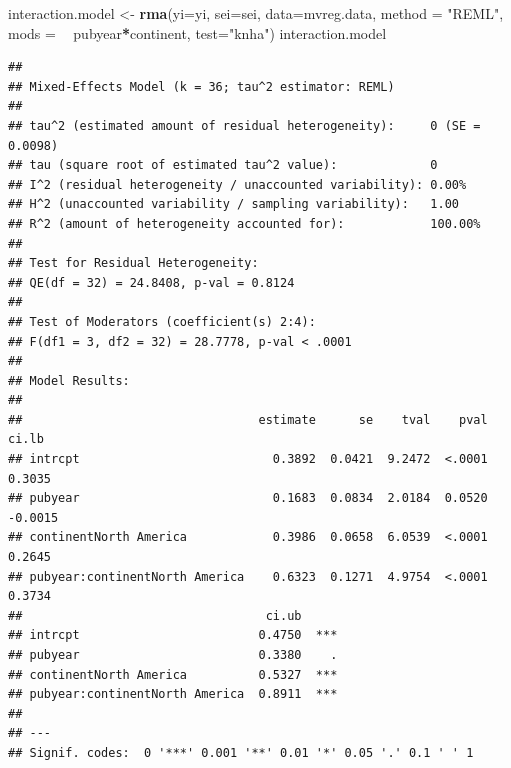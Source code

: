 \documentclass[]{book}
\newenvironment{Shaded}{\begin{snugshade}}{\end{snugshade}}
\newcommand{\DataTypeTok}[1]{\textcolor[rgb]{0.13,0.29,0.53}{#1}}
\newcommand{\KeywordTok}[1]{\textcolor[rgb]{0.13,0.29,0.53}{\textbf{#1}}}
\newcommand{\NormalTok}[1]{#1}
\newcommand{\OperatorTok}[1]{\textcolor[rgb]{0.81,0.36,0.00}{\textbf{#1}}}
\newcommand{\StringTok}[1]{\textcolor[rgb]{0.31,0.60,0.02}{#1}}
\begin{document}
\begin{Shaded}
\begin{Highlighting}[]
\NormalTok{interaction.model <-}\StringTok{ }\KeywordTok{rma}\NormalTok{(}\DataTypeTok{yi=}\NormalTok{yi,}
                         \DataTypeTok{sei=}\NormalTok{sei, }
                         \DataTypeTok{data=}\NormalTok{mvreg.data, }
                         \DataTypeTok{method =} \StringTok{"REML"}\NormalTok{, }
                         \DataTypeTok{mods =} \OperatorTok{~}\StringTok{ }\NormalTok{pubyear}\OperatorTok{*}\NormalTok{continent, }
                         \DataTypeTok{test=}\StringTok{"knha"}\NormalTok{)}
\NormalTok{interaction.model}
\end{Highlighting}
\end{Shaded}

\begin{verbatim}
## 
## Mixed-Effects Model (k = 36; tau^2 estimator: REML)
## 
## tau^2 (estimated amount of residual heterogeneity):     0 (SE = 0.0098)
## tau (square root of estimated tau^2 value):             0
## I^2 (residual heterogeneity / unaccounted variability): 0.00%
## H^2 (unaccounted variability / sampling variability):   1.00
## R^2 (amount of heterogeneity accounted for):            100.00%
## 
## Test for Residual Heterogeneity: 
## QE(df = 32) = 24.8408, p-val = 0.8124
## 
## Test of Moderators (coefficient(s) 2:4): 
## F(df1 = 3, df2 = 32) = 28.7778, p-val < .0001
## 
## Model Results:
## 
##                                 estimate      se    tval    pval    ci.lb
## intrcpt                           0.3892  0.0421  9.2472  <.0001   0.3035
## pubyear                           0.1683  0.0834  2.0184  0.0520  -0.0015
## continentNorth America            0.3986  0.0658  6.0539  <.0001   0.2645
## pubyear:continentNorth America    0.6323  0.1271  4.9754  <.0001   0.3734
##                                  ci.ub     
## intrcpt                         0.4750  ***
## pubyear                         0.3380    .
## continentNorth America          0.5327  ***
## pubyear:continentNorth America  0.8911  ***
## 
## ---
## Signif. codes:  0 '***' 0.001 '**' 0.01 '*' 0.05 '.' 0.1 ' ' 1
\end{verbatim}
\end{document}

